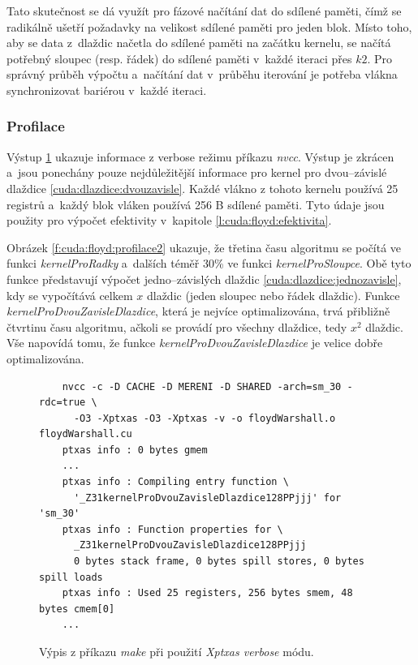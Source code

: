 Tato skutečnost se dá využít pro fázové načítání dat do sdílené paměti, čímž se radikálně ušetří požadavky na velikost sdílené paměti
pro jeden blok. Místo toho, aby se data z~dlaždic načetla do sdílené paměti na začátku kernelu, se načítá potřebný sloupec (resp. řádek)
do sdílené paměti v~každé iteraci přes $k2$. Pro správný průběh výpočtu a~načítání dat v~průběhu iterování je potřeba vlákna synchronizovat
bariérou v~každé iteraci.


\subsubsection{Profilace} \label{l:cuda:profilace}
Výstup \ref{f:cuda:floyd:profilace} ukazuje informace z verbose režimu příkazu \emph{nvcc}. Výstup je zkrácen a~jsou ponechány pouze nejdůležitější informace pro kernel pro dvou--závislé dlaždice \ref{cuda:dlazdice:dvouzavisle}. Každé vlákno z tohoto kernelu používá 25 registrů a~každý blok vláken používá 256 B sdílené paměti. Tyto údaje jsou použity pro výpočet efektivity v~kapitole \ref{l:cuda:floyd:efektivita}.

Obrázek \ref{f:cuda:floyd:profilace2} ukazuje, že třetina času algoritmu se počítá ve funkci \emph{kernelProRadky} a~dalších téměř 30\% ve funkci \emph{kernelProSloupce}. Obě tyto funkce představují výpočet jedno--závislých dlaždic \ref{cuda:dlazdice:jednozavisle}, kdy se vypočítává celkem $x$ dlaždic (jeden sloupec nebo řádek dlaždic). Funkce \emph{kernelProDvouZavisleDlazdice}, která je nejvíce optimalizována, trvá přibližně čtvrtinu času algoritmu, ačkoli se provádí pro všechny dlaždice, tedy $x^2$ dlaždic. Vše napovídá tomu, že funkce \emph{kernelProDvouZavisleDlazdice} je velice dobře optimalizována.

\begin{figure}
	\centering
	\begin{verbatim}
	nvcc -c -D CACHE -D MERENI -D SHARED -arch=sm_30 -rdc=true \
	  -O3 -Xptxas -O3 -Xptxas -v -o floydWarshall.o floydWarshall.cu
	ptxas info : 0 bytes gmem
	...
	ptxas info : Compiling entry function \
	  '_Z31kernelProDvouZavisleDlazdice128PPjjj' for 'sm_30'
	ptxas info : Function properties for \
	  _Z31kernelProDvouZavisleDlazdice128PPjjj
	  0 bytes stack frame, 0 bytes spill stores, 0 bytes spill loads
	ptxas info : Used 25 registers, 256 bytes smem, 48 bytes cmem[0]
	...
	\end{verbatim}
	\caption{Výpis z příkazu \emph{make} při použití \emph{Xptxas verbose} módu.}
    \label{f:cuda:floyd:profilace}
\end{figure}


